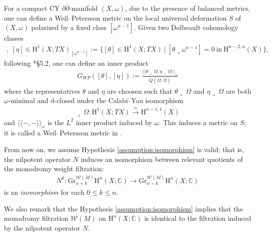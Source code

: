 For a compact CY \(\partial\bar{\partial}\)-manifold \((X,\omega)\), due to the presence of balanced metrics, one
can define a Weil--Petersson metric on the local universal deformation 
\(S\) of \((X,\omega)\) polarized by a fixed class \([\omega^{n-1}]\).
Given two Dolbeault cohomology classes 
\begin{eqnarray*}
[\theta],~[\eta]
\in\mathrm{H}^{1}(X;TX)_{[\omega^{n-1}]}:=\{[\theta]\in\mathrm{H}^{1}(X;TX)~|~
[\theta\lrcorner\omega^{n-1}]=0~\mbox{in}~\mathrm{H}^{n-2,n}(X)\},
\end{eqnarray*}
following \cite{2019-Popovici-holomorphic-deformations-of-balanced-calabi-yau-d-dbar-manifolds}*{\S 5.2}, one can define
an inner product
\begin{eqnarray*}
G_{WP}([\theta],[\eta]):=\frac{\langle\!\langle \theta\lrcorner~\Omega,
\eta\lrcorner~\Omega\rangle\!\rangle_{\omega}}{\tilde{Q}(\Omega,\bar{\Omega})}
\end{eqnarray*}
where the representatives \(\theta\) and \(\eta\)
are choosen such that 
\(\theta\lrcorner~\Omega\) and 
\(\eta\lrcorner~\Omega\) are both \(\omega\)-minimal and \(\mathrm{d}\)-closed
under the Calabi--Yau isomorphism
\begin{eqnarray*}
\lrcorner~\Omega\colon \mathrm{H}^{1}(X;TX)\xrightarrow{\simeq}\mathrm{H}^{n-1,1}(X)
\end{eqnarray*}
and \(\langle\!\langle -,-\rangle\!\rangle_{\omega}\)
is the \(L^{2}\) inner product induced by \(\omega\).
This induces a metric on \(S\); it is called 
a Weil--Petersson metric in \cite{2019-Popovici-holomorphic-deformations-of-balanced-calabi-yau-d-dbar-manifolds}.

From now on, we assume Hypothesis \ref{assumption:isomorphism}
is valid; that is, 
the nilpotent operator \(N\) induces an isomorphism
between relevant quotients of
the monodromy weight filtration:
\begin{eqnarray*}
N^{k}\colon 
\mathrm{Gr}^{\mathcal{W}(M)}_{n+k}\mathrm{H}^{n}(X;\mathbb{C})\to 
\mathrm{Gr}^{\mathcal{W}(M)}_{n-k}\mathrm{H}^{n}(X;\mathbb{C})
\end{eqnarray*}
is an \emph{isomorphism} for each \(0\le k\le n\).

We also remark that the Hypothesis \ref{assumption:isomorphism}
implies that the monodromy filtration \(\mathcal{W}(M)\) on 
\(\mathrm{H}^{n}(X;\mathbb{C})\)
is identical to the filtration induced by the nilpotent operator \(N\).


